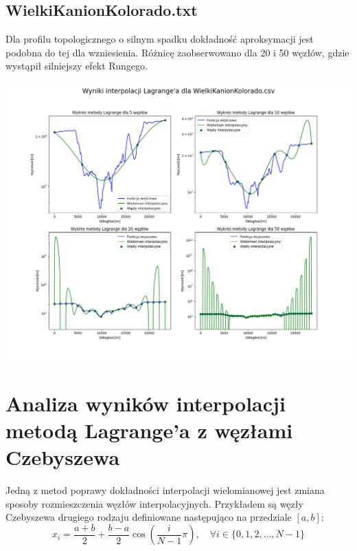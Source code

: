 \documentclass[a4paper,12pt]{article}
\begin{document}
	\subsection{WielkiKanionKolorado.txt}
	Dla profilu topologicznego o silnym spadku dokładność aproksymacji jest podobna do tej dla wzniesienia. Różnicę zaobserwowano dla 20 i 50 węzłów, gdzie wystąpił silniejszy efekt Rungego.
	\begin{center}
        \includegraphics[scale=0.4]{../charts/lagrange_WielkiKanionKolorado.png}
    \end{center}
    
\section{Analiza wyników interpolacji metodą Lagrange'a z węzłami Czebyszewa}
	Jedną z metod poprawy dokładności interpolacji wielomianowej jest zmiana sposoby rozmieszczenia węzłów interpolacyjnych. Przykładem są węzły Czebyszewa drugiego rodzaju definiowane następująco na przedziale $[a, b]$:
	\begin{equation}
	x_i = \frac{a+b}{2} + \frac{b-a}{2}\cos(\frac{i}{N-1}\pi), \quad \forall i \in \{0, 1, 2, \dots, N-1\}
	\end{equation}
\end{document}
